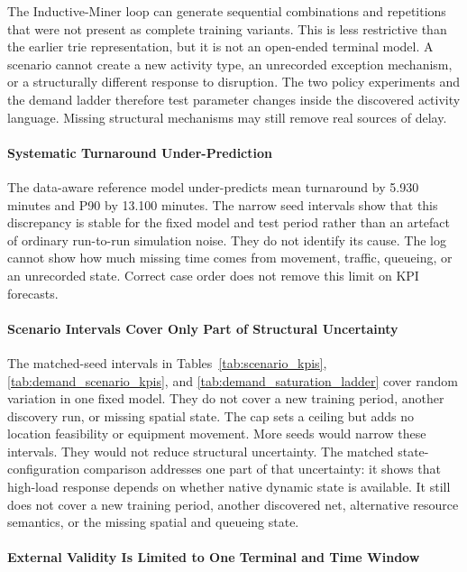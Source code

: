 The Inductive-Miner loop can generate sequential combinations and repetitions
that were not present as complete training variants. This is less restrictive
than the earlier trie representation, but it is not an open-ended terminal
model. A scenario cannot create a new activity type, an unrecorded exception
mechanism, or a structurally different response to disruption. The two policy
experiments and the demand ladder therefore test parameter changes inside the
discovered activity language. Missing structural mechanisms may still remove
real sources of delay.

\paragraph{Systematic Turnaround Under-Prediction}

The data-aware reference model under-predicts mean turnaround by 5.930 minutes and P90 by
13.100 minutes. The narrow seed intervals show that this discrepancy is stable
for the fixed model and test period rather than an artefact of ordinary
run-to-run simulation noise. They do not identify its cause. The log cannot
show how much missing time comes from
movement, traffic, queueing, or an unrecorded state. Correct case order does
not remove this limit on KPI forecasts.

\paragraph{Scenario Intervals Cover Only Part of Structural Uncertainty}

The matched-seed intervals in Tables~\ref{tab:scenario_kpis},
\ref{tab:demand_scenario_kpis}, and
\ref{tab:demand_saturation_ladder} cover random
variation in one fixed model. They do not cover a new training period, another
discovery run, or missing spatial state. The cap sets a ceiling but adds no
location feasibility or equipment movement. More seeds would narrow these
intervals. They would not reduce structural uncertainty. The matched
state-configuration comparison addresses one part of that uncertainty: it
shows that high-load response depends on whether native dynamic state is
available. It still does not cover a new training period, another discovered net,
alternative resource semantics, or the missing spatial and queueing state.

\paragraph{External Validity Is Limited to One Terminal and Time Window}

